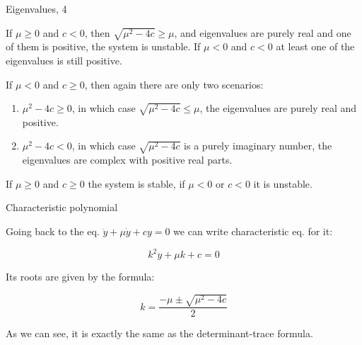 \documentclass{beamer}
\begin{document}
\begin{frame}{Eigenvalues, 4}
	\begin{flushleft}
		
		
		If $\mu \geq 0$ and $c < 0$, then $\sqrt{\mu^2 - 4c} \geq \mu$, and eigenvalues are purely real and one of them is positive, the system is unstable. If $\mu < 0$ and $c < 0$ at least one of the eigenvalues is still positive.
		
		\bigskip
		
		If $\mu < 0$ and $c \geq 0$, then again there are only two scenarios: 
		
		\begin{enumerate}
			\item $\mu^2 - 4c \geq 0$, in which case $\sqrt{\mu^2 - 4c} \leq \mu$, the eigenvalues are purely real and positive.
			\item $\mu^2 - 4c < 0$, in which case $\sqrt{\mu^2 - 4c}$ is a purely imaginary number, the eigenvalues are complex with positive real parts.
		\end{enumerate}
		
		\begin{definition}
			If $\mu \geq 0$ and $c \geq 0$ the system is stable, if $\mu < 0$ or $c < 0$ it is unstable.
		\end{definition}
		
	\end{flushleft}
\end{frame}




\begin{frame}{Characteristic polynomial}
	\begin{flushleft}
		
		Going back to the eq. $\ddot y + \mu \dot y + c y = 0$ we can write characteristic eq. for it:
		
		\begin{equation}
			k^2 y + \mu k + c = 0
		\end{equation}
		
		Its roots are given by the formula:
		
		\begin{equation}
			k = \frac{-\mu \pm \sqrt{\mu^2 - 4c} }{2}
		\end{equation}
		
		As we can see, it is exactly the same as the determinant-trace formula.
		
		
	\end{flushleft}
\end{frame}
\end{document}
